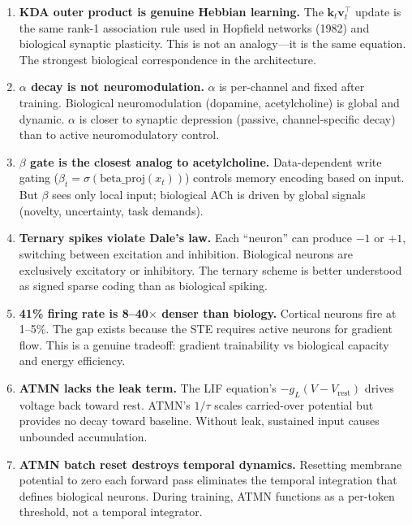 \documentclass[11pt,a4paper]{article}
\begin{document}
\begin{enumerate}

\item \textbf{KDA outer product is genuine Hebbian learning.} The $\mathbf{k}_t \mathbf{v}_t^\top$ update is the same rank-1 association rule used in Hopfield networks (1982) and biological synaptic plasticity. This is not an analogy---it is the same equation. The strongest biological correspondence in the architecture.

\item \textbf{$\alpha$ decay is not neuromodulation.} $\alpha$ is per-channel and fixed after training. Biological neuromodulation (dopamine, acetylcholine) is global and dynamic. $\alpha$ is closer to synaptic depression (passive, channel-specific decay) than to active neuromodulatory control.

\item \textbf{$\beta$ gate is the closest analog to acetylcholine.} Data-dependent write gating ($\beta_t = \sigma(\mathrm{beta\_proj}(x_t))$) controls memory encoding based on input. But $\beta$ sees only local input; biological ACh is driven by global signals (novelty, uncertainty, task demands).

\item \textbf{Ternary spikes violate Dale's law.} Each ``neuron'' can produce $-1$ or $+1$, switching between excitation and inhibition. Biological neurons are exclusively excitatory or inhibitory. The ternary scheme is better understood as signed sparse coding than as biological spiking.

\item \textbf{41\% firing rate is 8--40$\times$ denser than biology.} Cortical neurons fire at 1--5\%. The gap exists because the STE requires active neurons for gradient flow. This is a genuine tradeoff: gradient trainability vs biological capacity and energy efficiency.

\item \textbf{ATMN lacks the leak term.} The LIF equation's $-g_L(V - V_{\mathrm{rest}})$ drives voltage back toward rest. ATMN's $1/\tau$ scales carried-over potential but provides no decay toward baseline. Without leak, sustained input causes unbounded accumulation.

\item \textbf{ATMN batch reset destroys temporal dynamics.} Resetting membrane potential to zero each forward pass eliminates the temporal integration that defines biological neurons. During training, ATMN functions as a per-token threshold, not a temporal integrator.


\end{enumerate}
\end{document}
